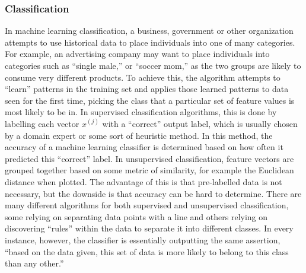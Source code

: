 \documentclass[12pt]{article} %
\begin{document}
\subsubsection{Classification}
In machine learning classification, a business, government or other organization attempts to use historical data to place individuals into one of many categories. For example, an advertising company may want to place individuals into categories such as ``single male,'' or ``soccer mom,'' as the two groups are likely to consume very different products. To achieve this, the algorithm attempts to ``learn'' patterns in the training set and applies those learned patterns to data seen for the first time, picking the class that a particular set of feature values is most likely to be in. In supervised classification algorithms, this is done by labelling each vector $x^{(j)}$ with a ``correct'' output label, which is usually chosen by a domain expert or some sort of heuristic method. In this method, the accuracy of a machine learning classifier is determined based on how often it predicted this ``correct'' label. In unsupervised classification, feature vectors are grouped together based on some metric of similarity, for example the Euclidean distance when plotted. The advantage of this is that pre-labelled data is not necessary, but the downside is that accuracy can be hard to determine. There are many different algorithms for both supervised and unsupervised classification, some relying on separating data points with a line and others relying on discovering ``rules'' within the data to separate it into different classes. In every instance, however, the classifier is essentially outputting the same assertion, ``based on the data given, this set of data is more likely to belong to this class than any other.''
\end{document}
